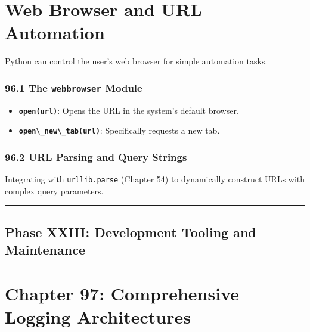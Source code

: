\hypertarget{web-browser-and-url-automation}{%
\chapter{Web Browser and URL
Automation}\label{web-browser-and-url-automation}}

Python can control the user's web browser for simple automation tasks.

\hypertarget{the-webbrowser-module}{%
\subsection{\texorpdfstring{96.1 The \texttt{webbrowser}
Module}{96.1 The webbrowser Module}}\label{the-webbrowser-module}}

\begin{itemize}
\tightlist
\item
  \textbf{\passthrough{\lstinline!open(url)!}}: Opens the URL in the
  system's default browser.
\item
  \textbf{\passthrough{\lstinline!open\_new\_tab(url)!}}: Specifically
  requests a new tab.
\end{itemize}

\hypertarget{url-parsing-and-query-strings}{%
\subsection{96.2 URL Parsing and Query
Strings}\label{url-parsing-and-query-strings}}

Integrating with \passthrough{\lstinline!urllib.parse!} (Chapter 54) to
dynamically construct URLs with complex query parameters.

\begin{center}\rule{0.5\linewidth}{0.5pt}\end{center}

\hypertarget{phase-xxiii-development-tooling-and-maintenance}{%
\section{Phase XXIII: Development Tooling and
Maintenance}\label{phase-xxiii-development-tooling-and-maintenance}}

\hypertarget{chapter-97-comprehensive-logging-architectures}{%
\chapter{Chapter 97: Comprehensive Logging
Architectures}\label{chapter-97-comprehensive-logging-architectures}}

